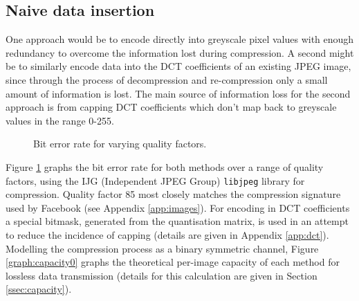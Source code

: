 \subsection{Naive data insertion}
\label{ssec:naive}

One approach would be to encode directly into greyscale pixel values with enough redundancy to overcome the information lost during compression. A second might be to similarly encode data into the DCT coefficients of an existing JPEG image, since through the process of decompression and re-compression only a small amount of information is lost. The main source of information loss for the second approach is from capping DCT coefficients which don't map back to greyscale values in the range 0-255.

\begin{figure}[tbph]
  \begin{center}
    \caption{Bit error rate for varying quality factors.}
    \label{graph:ber0}
  \end{center}
\end{figure}

Figure \ref{graph:ber0} graphs the bit error rate for both methods over a range of quality factors, using the IJG (Independent JPEG Group) {\tt libjpeg} library for compression. Quality factor 85 most closely matches the compression signature used by Facebook (see Appendix \ref{app:images}). For encoding in DCT coefficients a special bitmask, generated from the quantisation matrix, is used in an attempt to reduce the incidence of capping (details are given in Appendix \ref{app:dct}). Modelling the compression process as a binary symmetric channel, Figure \ref{graph:capacity0} graphs the theoretical per-image capacity of each method for lossless data transmission (details for this calculation are given in Section \ref{ssec:capacity}).


